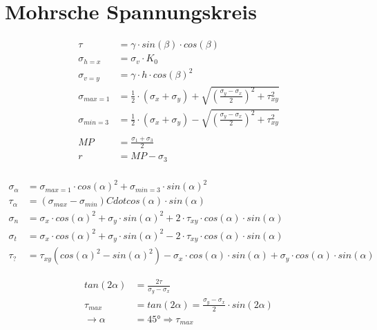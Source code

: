 \section{Mohrsche Spannungskreis}
	\begin{minipage}{\linewidth}
	\begin{align*}
		\tau	 		&= \gamma \cdot sin(\beta) \cdot cos(\beta) \\
		\sigma_{h=x} 	&= \sigma_v \cdot K_0 \\
		\sigma_{v=y} 	&= \gamma \cdot h \cdot cos(\beta)^2 \\ 
		\sigma_{max=1}	&=\frac{1}{2} \cdot (\sigma_x + \sigma_y) + \sqrt{\left(\frac{\sigma_y - \sigma_x}{2}\right)^2 + \tau_{xy}^2} \\
		\sigma_{min=3}	&=\frac{1}{2} \cdot (\sigma_x + \sigma_y) - \sqrt{\left(\frac{\sigma_y - \sigma_x}{2}\right)^2 + \tau_{xy}^2} \\
	 \\
		MP				&= \frac{\sigma_1 + \sigma_3}{2} \\
		r				&= MP - \sigma_3 \\
	\end{align*}
	\end{minipage}	
	
	\vspace*{4cm}
	\begin{minipage}{\linewidth}
	\begin{align*}
		\sigma_\alpha	&=\sigma_{max=1} \cdot cos(\alpha)^2 + \sigma_{min=3} \cdot sin(\alpha)^2 \\
		\tau_\alpha		&= (\sigma_{max} -\sigma_{min}) Cdot cos(\alpha) \cdot sin(\alpha) \\
		\sigma_n		&= \sigma_x \cdot cos(\alpha)^2 + \sigma_y \cdot sin(\alpha)^2 + 2 \cdot \tau_{xy} \cdot cos(\alpha) \cdot sin(\alpha) \\
		\sigma_t		&= \sigma_x \cdot cos(\alpha)^2 + \sigma_y \cdot sin(\alpha)^2 - 2 \cdot \tau_{xy} \cdot cos(\alpha) \cdot sin(\alpha) \\
		\tau_?			&= \tau_{xy} (cos(\alpha)^2 - sin(\alpha)^2) - \sigma_x \cdot cos(\alpha) \cdot sin(\alpha) + \sigma_y \cdot cos(\alpha) \cdot sin(\alpha)
	\end{align*}
	\end{minipage}

	\vspace*{4cm}
	\begin{minipage}{\linewidth}
	\begin{align*}
		tan(2 \alpha)	&= \frac{2 \tau}{\sigma_y - \sigma_x} \\
		\tau_{max}		&= tan(2 \alpha) = \frac{\sigma_y - \sigma_x}{2} \cdot sin(2 \alpha) \\
		\rightarrow \alpha &= 45° \Rightarrow \tau_{max} \\ 
	\end{align*}
	\end{minipage}